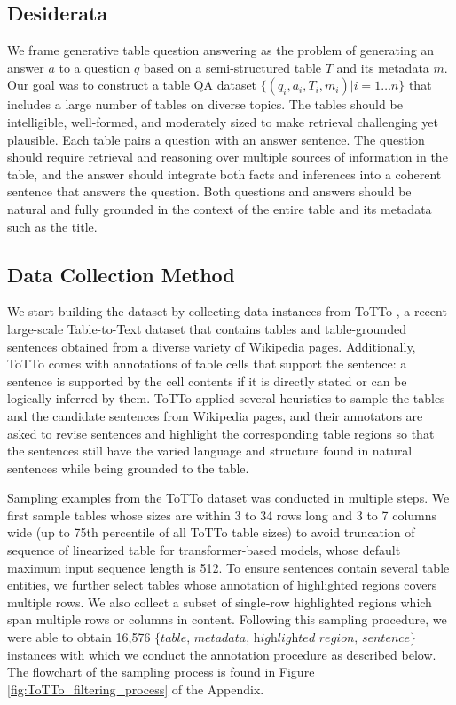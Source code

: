 \documentclass[11pt,a4paper]{article}
\begin{document}
\subsection{Desiderata}
We frame 
generative
table question answering as the problem of 
generating an answer $a$ to a question $q$ based on a semi-structured table $T$ and its metadata $m$. 
Our goal was to construct a table QA dataset $\{(q_i, a_i, T_i, m_i)|i=1\ldots n\}$ that includes a large number of tables on diverse topics. The tables should be intelligible, well-formed, and moderately sized to make retrieval challenging yet plausible. Each table pairs a question with an answer sentence. The question should require retrieval and reasoning over multiple sources of information in the table, and the answer should integrate both facts and inferences into a coherent sentence that answers the question. Both questions and answers should be natural and fully grounded in the context of the entire table and its metadata such as the title.

\subsection{Data Collection Method}
We start building the dataset by collecting data instances from ToTTo \cite{parikh-etal-2020-totto}, a recent large-scale Table-to-Text dataset that contains tables and table-grounded sentences obtained from a diverse variety of Wikipedia pages. Additionally, ToTTo comes with annotations of table cells that support the sentence: a sentence is supported by the cell contents if it is directly stated or can be logically inferred by them. ToTTo applied several heuristics to sample the tables and the candidate sentences from Wikipedia pages, and their annotators are asked to revise sentences and highlight the corresponding table regions so that the sentences still have the varied language and structure found in natural sentences while being grounded to the table.

Sampling examples from the ToTTo dataset was conducted in multiple steps.
We first sample tables whose sizes are within 3 to 34 rows long and 3 to 7 columns wide (up to 75th percentile of all ToTTo table sizes)
to avoid truncation of sequence of linearized table for transformer-based models, whose default maximum input sequence length is 512. 
To ensure sentences contain several table entities, we further select tables whose annotation of highlighted regions covers multiple rows. 
We also collect a subset of single-row highlighted regions which span multiple rows or columns in content.
Following this sampling procedure, we were able to obtain 16,576 $\{\textit{table, metadata, highlighted region, sentence}\}$ instances with which we conduct the annotation procedure as described below. The flowchart of the sampling process is found in Figure \ref{fig:ToTTo_filtering_process} of the Appendix.
\end{document}
